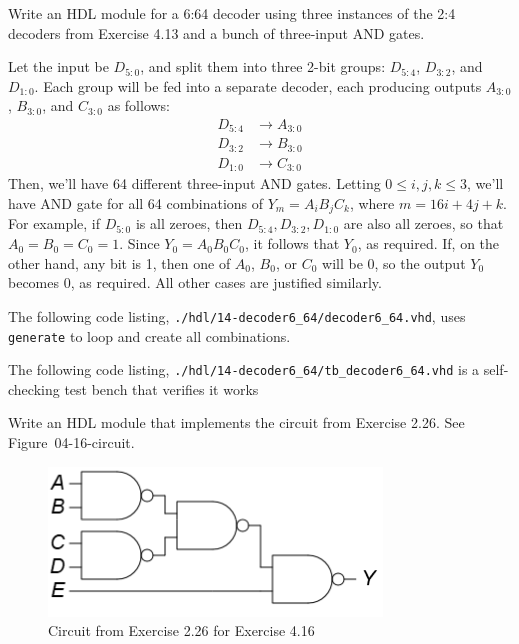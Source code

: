 \documentclass[12pt]{article}
\newenvironment{ex}[2][Exercise]{\begin{trivlist}
		\item[\hskip \labelsep {\bfseries #1}\hskip \labelsep {\bfseries #2.}]}{\end{trivlist}}
\newenvironment{sol}[1][Solution]{\begin{trivlist}
		\item[\hskip \labelsep {\bfseries #1:}]}{\end{trivlist}}
\begin{document}
\begin{ex}{4.14}
	Write an HDL module for a 6:64 decoder using three instances of
	the 2:4 decoders from Exercise 4.13 and a bunch of three-input AND gates.
\end{ex}

\begin{sol}
	Let the input be $D_{5:0}$, and split them into three 2-bit groups: $D_{5:4}$, $D_{3:2}$, and $D_{1:0}$.
	Each group will be fed into a separate decoder, each producing outputs
	$A_{3:0}$, $B_{3:0}$, and $C_{3:0}$ as follows:
	\begin{align*}
		D_{5:4} & \to A_{3:0}\\
		D_{3:2} & \to B_{3:0}\\
		D_{1:0} & \to C_{3:0}
	\end{align*}
	Then, we'll have 64 different three-input AND gates. Letting $0\leq i, j, k \leq 3$,
	we'll have AND gate for all 64 combinations of $Y_m=A_iB_jC_k$, where $m=16i+4j+k$.
	For example, if $D_{5:0}$ is all zeroes, then $D_{5:4}, D_{3:2},D_{1:0}$ are also all zeroes,
	so that $A_0=B_0=C_0=1$. Since $Y_0=A_0B_0C_0$, it follows that $Y_0$, as required. If,
	on the other hand, any bit is 1, then one of $A_0$, $B_0$, or $C_0$ will be 0,
	so the output $Y_0$ becomes 0, as required. All other cases are justified similarly.
	
	The following code listing,
	\texttt{./hdl/14-decoder6\_64/decoder6\_64.vhd}, uses \texttt{generate} to loop and create
	all combinations.
	
	
	The following code listing, \texttt{./hdl/14-decoder6\_64/tb\_decoder6\_64.vhd} is a
	self-checking test bench that verifies it works
	
\end{sol}

\begin{ex}{4.16}
	Write an HDL module that implements the circuit from Exercise 2.26. See Figure~{04-16-circuit}.
	\begin{figure}
		\centering
		\includegraphics{04-16-circuit}
		\caption{Circuit from Exercise 2.26 for Exercise 4.16}
		\label{04-16-circuit}
	\end{figure}
\end{ex}
\end{document}
